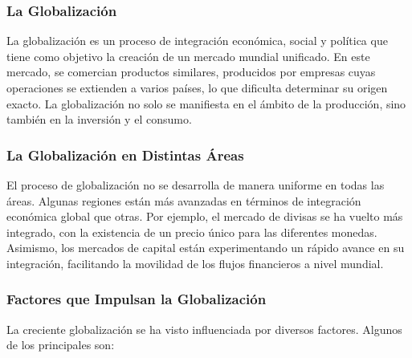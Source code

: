 \documentclass[
  letterpaper,
  DIV=11,
  numbers=noendperiod]{scrartcl}
\begin{document}
\hypertarget{la-globalizaciuxf3n}{%
\subsubsection{La Globalización}\label{la-globalizaciuxf3n}}

La globalización es un proceso de integración económica, social y
política que tiene como objetivo la creación de un mercado mundial
unificado. En este mercado, se comercian productos similares, producidos
por empresas cuyas operaciones se extienden a varios países, lo que
dificulta determinar su origen exacto. La globalización no solo se
manifiesta en el ámbito de la producción, sino también en la inversión y
el consumo.

\hypertarget{la-globalizaciuxf3n-en-distintas-uxe1reas}{%
\subsubsection{La Globalización en Distintas
Áreas}\label{la-globalizaciuxf3n-en-distintas-uxe1reas}}

El proceso de globalización no se desarrolla de manera uniforme en todas
las áreas. Algunas regiones están más avanzadas en términos de
integración económica global que otras. Por ejemplo, el mercado de
divisas se ha vuelto más integrado, con la existencia de un precio único
para las diferentes monedas. Asimismo, los mercados de capital están
experimentando un rápido avance en su integración, facilitando la
movilidad de los flujos financieros a nivel mundial.

\hypertarget{factores-que-impulsan-la-globalizaciuxf3n}{%
\subsubsection{Factores que Impulsan la
Globalización}\label{factores-que-impulsan-la-globalizaciuxf3n}}

La creciente globalización se ha visto influenciada por diversos
factores. Algunos de los principales son:
\end{document}
